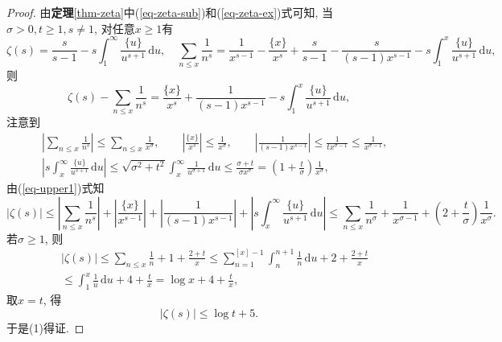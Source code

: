 \documentclass[12pt, a4paper, oneside]{ctexart}
\numberwithin{equation}{section}  %
\let\leq=\leqslant %
\let\geq=\geqslant %
\def\d{\mathrm{d}}          %
\begin{document}
\begin{proof}
    由\textbf{定理}\ref{thm-zeta}中(\ref{eq-zeta-sub})和(\ref{eq-zeta-ex})式可知, 当$\sigma > 0, t\geq 1, s\neq 1$, 对任意$x \geq 1$有
    \begin{equation*}
        \zeta(s)=\frac{s}{s-1}-s\int_1^{\infty}\frac{\{u\}}{u^{s+1}}\,\d u,\quad\sum_{n\leq x}\frac{1}{n^s}=\frac{1}{x^{s-1}}-\frac{\{x\}}{x^s}+\frac{s}{s-1}-\frac{s}{(s-1)x^{s-1}}-s\int_1^x\frac{\{u\}}{u^{s+1}}\,\d u,
    \end{equation*}
    则
    \begin{equation}\label{eq-upper1}
        \zeta(s)-\sum_{n\leq x}\frac{1}{n^s}= \frac{\{x\}}{x^s}+\frac{1}{(s-1)x^{s-1}}-s\int_1^x\frac{\{u\}}{u^{s+1}}\,\d u,
    \end{equation}
    注意到
    \begin{equation*}
        \begin{aligned}
            &\ \left|\sum_{n\leq x}\frac{1}{n^s}\right|\leq \sum_{n\leq x}\frac{1}{x^{\sigma}},\qquad \left|\frac{\{x\}}{x^s}\right|\leq \frac{1}{x^\sigma},\qquad\left|\frac{1}{(s-1)x^{s-1}}\right|\leq\frac{1}{tx^{\sigma -1}}\leq \frac{1}{x^{\sigma -1}},\\
            &\ \left|s\int_x^{\infty}\frac{\{u\}}{u^{s+1}}\,\d u\right|\leq \sqrt{\sigma^2+t^2}\int_x^{\infty}\frac{1}{u^{\sigma +1}}\,\d u\leq \frac{\sigma + t}{\sigma x^\sigma} = \left(1+\frac{t}{\sigma}\right)\frac{1}{x^{\sigma}},
        \end{aligned}
    \end{equation*}
    由(\ref{eq-upper1})式知
    \begin{equation}\label{eq-upper2}
        |\zeta(s)|\leq \left|\sum_{n\leq x}\frac{1}{n^s}\right|+\left|\frac{\{x\}}{x^{s-1}}\right|+\left|\frac{1}{(s-1)x^{s-1}}\right|+\left|s\int_x^{\infty}\frac{\{u\}}{u^{s+1}}\,\d u\right|\leq \sum_{n\leq x}\frac{1}{n^{\sigma}}+\frac{1}{x^{\sigma - 1}}+\left(2+\frac{t}{\sigma}\right)\frac{1}{x^\sigma}.
    \end{equation}
    若$\sigma\geq 1$, 则
    \begin{equation*}
        \begin{aligned}
            &\ |\zeta(s)|\leq\sum_{n\leq x}\frac{1}{n}+1+\frac{2+t}{x}\leq \sum_{n=1}^{[x]-1}\int_n^{n+1}\frac{1}{n}\,\d u+2+\frac{2+t}{x}\\
            &\ \leq \int_1^x\frac{1}{u}\,\d u+4+\frac{t}{x} = \log x+4+\frac{t}{x},
        \end{aligned}
    \end{equation*}
    取$x= t$, 得
    \begin{equation}\label{eq-upper3}
        |\zeta(s)|\leq \log t+5.
    \end{equation}
    于是(1)得证.


\end{proof}
\end{document}
